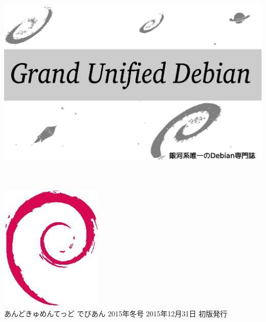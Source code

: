 \documentclass[mingoth,a4paper]{jsarticle}
\begin{document}
\begin{titlepage}
\thispagestyle{empty}

\hspace*{-2.5cm}
\includegraphics{image2012-natsu/gudeb.eps}\\
\\
\\

\hspace*{11cm}\includegraphics[height=6cm]{image200502/openlogo-nd.eps}\\
\vspace*{0.1cm}
\hfill あんどきゅめんてっど でびあん 2015年冬号 2015年12月31日 初版発行
\end{titlepage}

\newpage
\thispagestyle{empty}\mbox{}
\newpage
\end{document}
